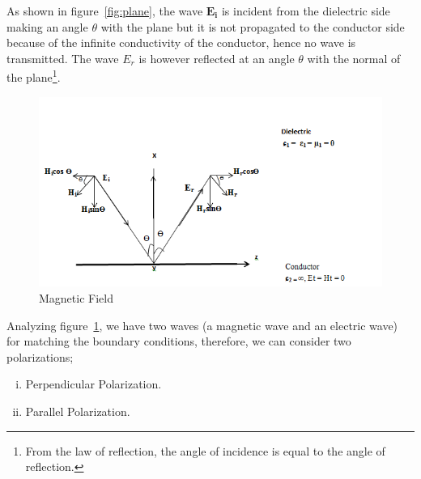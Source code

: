 As shown in figure~\ref{fig:plane}, the wave $\boldsymbol{E_i}$  is incident from the dielectric side making an angle $ \theta $ with the plane but it is not propagated to the conductor side because of the infinite conductivity of the conductor, hence no wave is transmitted. The wave $E_r$ is however reflected at an angle $ \theta $ with the normal of the plane\footnote{From the law of reflection, the angle of incidence is equal to the angle of reflection.}.
\begin{figure}[h]
\centering
\includegraphics[width=1\linewidth]{./graphics/fields}
\caption{Magnetic Field}
\label{fig:fields}
\end{figure}

Analyzing figure~\ref{fig:fields}, we have two waves (a magnetic wave and an electric wave) for matching the boundary conditions, therefore, we can consider two polarizations;
\begin{enumerate}[(i)]
\item Perpendicular Polarization. 
\item  Parallel Polarization.
\end{enumerate}

